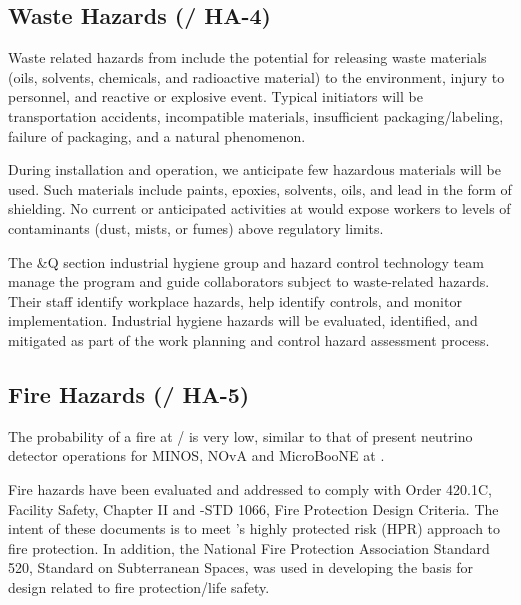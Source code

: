 \subsection{Waste Hazards (/ HA-4)}

Waste related hazards from  include the potential for
releasing waste materials (oils, solvents, chemicals, and radioactive
material) to the environment, injury to personnel, and reactive or
explosive event. Typical initiators will be transportation accidents,
incompatible materials, insufficient packaging/labeling, failure of
packaging, and a natural phenomenon.

During installation and  operation, we anticipate few
hazardous materials will be used. Such materials include paints,
epoxies, solvents, oils, and lead in the form of shielding. No current
or anticipated activities at  would expose workers to
levels of contaminants (dust, mists, or fumes) above regulatory
limits.

The \&Q section industrial hygiene group and hazard control
technology team manage the program and guide collaborators subject to
waste-related hazards.  Their staff identify workplace hazards, help
identify controls, and monitor implementation. Industrial hygiene
hazards will be evaluated, identified, and mitigated as part of the
work planning and control hazard assessment process.

\subsection{Fire Hazards (/ HA-5)}

The probability of a fire at / is very low,
similar to that of present neutrino detector operations for MINOS,
NOvA and MicroBooNE at \fnal. 


Fire hazards have been evaluated and addressed to comply with
 Order 420.1C, Facility Safety, Chapter II and
-STD 1066, Fire Protection Design Criteria.  The intent of
these documents is to meet 's highly protected risk (HPR)
approach to fire protection.  In addition, the National Fire
Protection Association Standard 520, Standard on Subterranean Spaces,
was used in developing the basis for design related to fire
protection/life safety.

